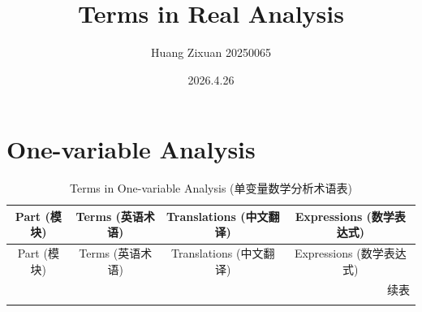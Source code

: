 \documentclass{article}
\title{\huge{Terms in Real Analysis}}
\author{Huang Zixuan 20250065}
\date{2026.4.26}
\begin{document}
  \maketitle

  \section{One-variable Analysis}
  \begin{longtable}{|c|c|c|c|}
    \caption{Terms in One-variable Analysis (单变量数学分析术语表)} \label{Tab.1} \\
    \hline
    Part (模块) & Terms (英语术语) & Translations (中文翻译) & Expressions (数学表达式) \\ 
    \hline
    \endfirsthead

    \hline
    Part (模块) & Terms (英语术语) & Translations (中文翻译) & Expressions (数学表达式) \\ 
    \hline
    \endhead

    \hline
    \multicolumn{4}{r}{续表} \\
    \endfoot

    \hline
    \endlastfoot


\end{longtable}
\end{document}
